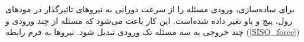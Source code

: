 برای ساده‌سازی، ورودی مسئله را از سرعت دورانی به نیروهای تاثیرگذار در مودهای رول، پیچ و یاو تغیر داده شده‌است. این کار باعث می‌شود که مسئله از چند ورودی و چند خروجی به سه مسئله تک ورودی تبدیل شود. نیروها به فرم رابطه 
(\ref{SISO_force})
